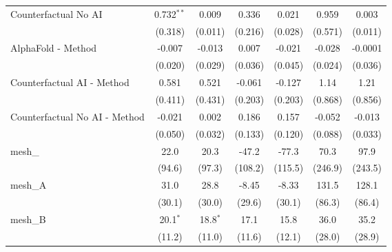 \begin{tabular}{lcccccc}
   Counterfactual No AI                                        & 0.732$^{**}$  & 0.009       & 0.336          & 0.021         & 0.959        & 0.003\\   
                                                               & (0.318)       & (0.011)     & (0.216)        & (0.028)       & (0.571)      & (0.011)\\   
   AlphaFold - Method                                          & -0.007        & -0.013      & 0.007          & -0.021        & -0.028       & -0.0001\\   
                                                               & (0.020)       & (0.029)     & (0.036)        & (0.045)       & (0.024)      & (0.036)\\   
   Counterfactual AI - Method                                  & 0.581         & 0.521       & -0.061         & -0.127        & 1.14         & 1.21\\   
                                                               & (0.411)       & (0.431)     & (0.203)        & (0.203)       & (0.868)      & (0.856)\\   
   Counterfactual No AI - Method                               & -0.021        & 0.002       & 0.186          & 0.157         & -0.052       & -0.013\\   
                                                               & (0.050)       & (0.032)     & (0.133)        & (0.120)       & (0.088)      & (0.033)\\   
   mesh\_                                                      & 22.0          & 20.3        & -47.2          & -77.3         & 70.3         & 97.9\\   
                                                               & (94.6)        & (97.3)      & (108.2)        & (115.5)       & (246.9)      & (243.5)\\   
   mesh\_A                                                     & 31.0          & 28.8        & -8.45          & -8.33         & 131.5        & 128.1\\   
                                                               & (30.1)        & (30.0)      & (29.6)         & (30.1)        & (86.3)       & (86.4)\\   
   mesh\_B                                                     & 20.1$^{*}$    & 18.8$^{*}$  & 17.1           & 15.8          & 36.0         & 35.2\\   
                                                               & (11.2)        & (11.0)      & (11.6)         & (12.1)        & (28.0)       & (28.9)\\   

\end{tabular}
